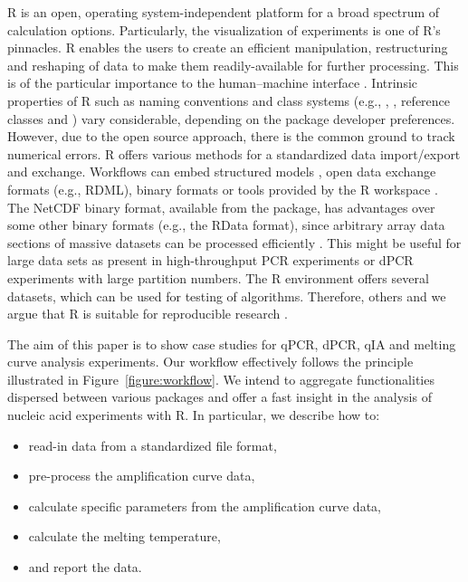 R is an open, operating system-independent platform for a broad spectrum of 
calculation options. Particularly, the visualization of experiments is one of 
R's pinnacles. R enables the users to create an efficient manipulation, 
restructuring and reshaping of data to make them readily-available for further 
processing. This is of the particular importance to the human--machine interface 
\citep{Oh_2014}. Intrinsic properties of R such as naming conventions 
\citep{Baaaath_2012} and class systems (e.g., , , 
reference classes and ) vary considerable, depending on the package 
developer preferences. However, due to the open source approach, there is the 
common ground to track numerical errors. R offers various methods for a 
standardized data import/export and exchange. Workflows can embed structured 
models \citet{Guazzelli_2009}, open data exchange formats (e.g., RDML), binary 
formats \citep{michna_2013} or tools provided by the R workspace 
\citep{RDCT2010c}. The NetCDF binary format, available from the 
 package, has advantages over some other binary formats (e.g., 
the RData format), since arbitrary array data sections of massive datasets can 
be processed efficiently \citep{michna_2013}. This might be useful for large 
data sets as present in high-throughput PCR experiments or dPCR experiments with large partition 
numbers. The R environment offers several datasets, which can be used for 
testing of algorithms. Therefore, others and we argue that R is suitable for 
reproducible research \citep{gentleman_2004, Murrell_2012, gandrud_2013, hofmann_2013, 
Ooms_2013, kuhn_cran_2014, Leeper_2014, liu_2014}.

The aim of this paper is to show case studies for qPCR, dPCR, qIA and melting 
curve analysis experiments. Our workflow effectively follows the principle 
illustrated in Figure~\ref{figure:workflow}. We intend to aggregate 
functionalities dispersed between various packages and offer a fast insight in 
the analysis of nucleic acid experiments with R. In particular, we describe how 
to:

\begin{itemize}
 \item read-in data from a standardized file format,
 \item pre-process the amplification curve data,
 \item calculate specific parameters from the amplification curve data,
 \item calculate the melting temperature,
 \item and report the data.
\end{itemize}

